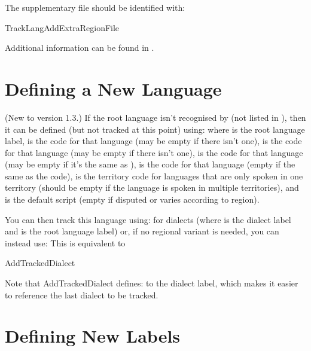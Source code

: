 \documentclass[titlepage=false,oneside,
 fontsize=12pt,captions=tableheading]{scrbook}
\begin{document}
The supplementary file should be identified with:
\begin{compactcodebox*}
\gls{TrackLangAddExtraRegionFile}
\end{compactcodebox*}

Additional information can be found in .

\section{Defining a New Language}
\label{sec:newlanguages}

(New to version 1.3.)
If the root language isn't recognised by 
(not listed in ), then
it can be defined (but not tracked at this point) using:
where  is the root language label, 
 is the  code for that language (may be
empty if there isn't one),  is the 
code for that language (may be empty if there isn't one),
 is the  code for that language (may be
empty if it's the same as ),  is the 
 code for that language (empty if the same as the 
 code),  is the territory  code for 
languages that are only spoken in one territory (should be empty if
the language is spoken in multiple territories), and  is the default script (empty if disputed or varies according
to region).

You can then track this language using: 
for dialects (where  is the dialect label and
 is the root language label) or, if 
no regional variant is needed, you can instead use:
This is equivalent to 
\begin{compactcodebox}
\gls{AddTrackedDialect}
\end{compactcodebox}
Note that \gls{AddTrackedDialect} defines:
to the dialect label, which makes it easier to reference the last
dialect to be tracked.

\section{Defining New  Labels}
\label{sec:definelabels}
\end{document}
